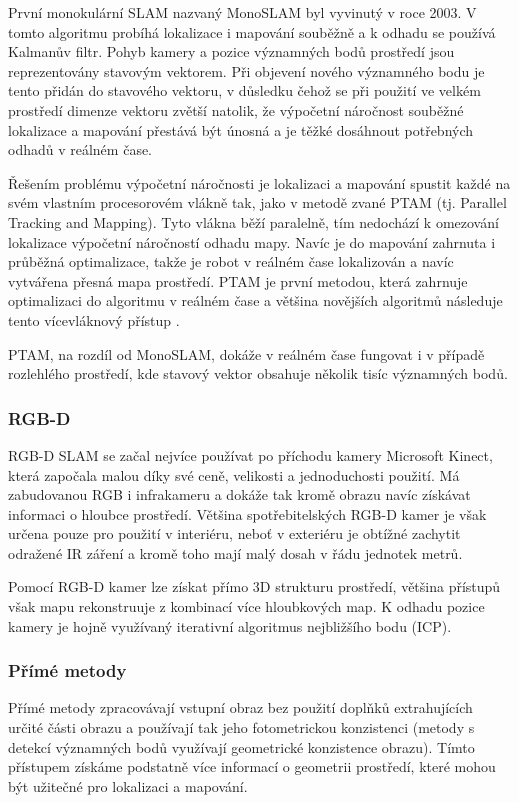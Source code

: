 \documentclass[12pt,a4paper]{article}
\begin{document}
První monokulární SLAM nazvaný MonoSLAM byl vyvinutý v roce 2003. V tomto algoritmu probíhá lokalizace i mapování souběžně a k odhadu se používá Kalmanův filtr. Pohyb kamery a pozice významných bodů prostředí jsou reprezentovány stavovým vektorem. Při objevení nového významného bodu je tento přidán do stavového vektoru, v důsledku čehož se při použití ve velkém prostředí dimenze vektoru zvětší natolik, že výpočetní náročnost souběžné lokalizace a mapování přestává být únosná a je těžké dosáhnout potřebných odhadů v reálném čase. 

Řešením problému výpočetní náročnosti je lokalizaci a mapování spustit každé na svém vlastním procesorovém vlákně tak, jako v metodě zvané PTAM (tj. Parallel Tracking and Mapping). Tyto vlákna běží paralelně, tím nedochází k omezování lokalizace výpočetní náročností odhadu mapy. Navíc je do mapování zahrnuta i průběžná optimalizace, takže je robot v reálném čase lokalizován a navíc vytvářena přesná mapa prostředí. PTAM je první metodou, která zahrnuje optimalizaci do algoritmu v reálném čase a většina novějších algoritmů následuje tento vícevláknový přístup \cite{Taketomi_visual}.

PTAM, na rozdíl od MonoSLAM, dokáže v reálném čase fungovat i v případě rozlehlého prostředí, kde stavový vektor obsahuje několik tisíc významných bodů.

\subsubsection{RGB-D}
RGB-D SLAM se začal nejvíce používat po příchodu kamery Microsoft Kinect, která započala malou  díky své ceně, velikosti a jednoduchosti použití. Má zabudovanou RGB i infrakameru a dokáže tak kromě obrazu navíc získávat informaci o hloubce prostředí. Většina spotřebitelských RGB-D kamer je však určena pouze pro použití v interiéru, neboť v exteriéru je obtížné zachytit odražené IR záření a kromě toho mají malý dosah v řádu jednotek metrů.

Pomocí RGB-D kamer lze získat přímo 3D strukturu prostředí, většina přístupů však mapu rekonstruuje z kombinací více hloubkových map. K odhadu pozice kamery je hojně využívaný iterativní algoritmus nejbližšího bodu (ICP). 

\subsubsection{Přímé metody}
Přímé metody zpracovávají vstupní obraz bez použití doplňků extrahujících určité části obrazu a používají tak jeho fotometrickou konzistenci (metody s detekcí významných bodů využívají geometrické konzistence obrazu). Tímto přístupem získáme podstatně více informací o geometrii prostředí, které mohou být užitečné pro lokalizaci a mapování.
\end{document}

